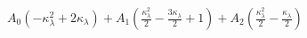 $
A_{0} \left(- \kappa_{\lambda}^{2} + 2 \kappa_{\lambda}\right) + A_{1} \left(\frac{\kappa_{\lambda}^{2}}{2} - \frac{3 \kappa_{\lambda}}{2} + 1\right) + A_{2} \left(\frac{\kappa_{\lambda}^{2}}{2} - \frac{\kappa_{\lambda}}{2}\right)
$
